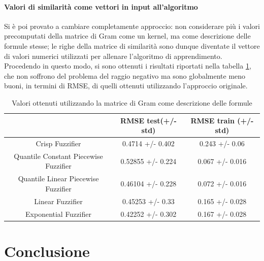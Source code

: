 \documentclass[12pt,a4paper]{report}
\begin{document}
\subsubsection{Valori di similarità come vettori in input all'algoritmo}
Si è poi provato a cambiare completamente approccio: non considerare più i valori precomputati della matrice di Gram come un kernel, ma come descrizione delle formule stesse; le righe della matrice di similarità sono dunque diventate il vettore di valori numerici utilizzati per allenare l'algoritmo di apprendimento.
Procedendo in questo modo, si sono ottenuti i risultati riportati nella tabella \ref{table:risultatiVettore}, che non soffrono del problema del raggio negativo ma sono globalmente meno buoni, in termini di RMSE, di quelli ottenuti utilizzando l'approccio originale.

\begin{table}[h!]
\centering 	
	\begin{tabular}{|c|c|c|} 
	 \hline
	  & RMSE test(+/- std) & RMSE train (+/- std)\\ [0.5ex] 
	 \hline
	 Crisp Fuzzifier & 0.4714  +/- 0.402 & 0.243 +/- 0.06 \\ 
	 \hline
	 Quantile Constant Piecewise Fuzzifier & 0.52855  +/- 0.224 & 0.067 +/- 0.016\\
	 \hline
	 Quantile Linear Piecewise Fuzzifier & 0.46104  +/- 0.228	& 0.072 +/- 0.016\\
	 \hline
	 Linear Fuzzifier &0.45253  +/- 0.33 & 0.165 +/- 0.028\\
	 \hline
	 Exponential Fuzzifier & 0.42252  +/- 0.302 & 0.167 +/-  0.028\\ [1ex] 
	 \hline
	\end{tabular}
	\caption{Valori ottenuti utilizzando la matrice di Gram come descrizione delle formule}
	\label{table:risultatiVettore}
\end{table}


\chapter*{Conclusione}



\end{document}

